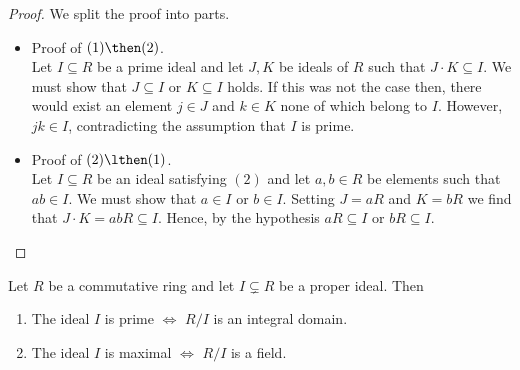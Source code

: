 \documentclass[12pt, a4paper]{article}
\begin{document}
\begin{proof}
    We split the proof into parts.
    \begin{itemize}
        \item Proof of \((1) \then (2)\). \\
        Let \(I \subseteq R\) be a prime ideal and let \(J,K\) be ideals of \(R\) such that \(J \cdot K \subseteq I\). We must show that \(J \subseteq I\) or \(K\subseteq I\) holds. If this was not the case then, there would exist an element \(j \in J\) and \(k \in K\) none of which belong to \(I\). However, \(jk \in I\), contradicting the assumption that \(I\) is prime.
        \item Proof of \((2) \lthen (1)\). \\
        Let \(I \subseteq R\) be an ideal satisfying \((2)\) and let \(a,b \in R\) be elements such that \(ab \in I\). We must show that \(a \in I\) or \(b \in I\). Setting \(J=aR\) and \(K=bR\) we find that \(J \cdot K = abR \subseteq I\). Hence, by the hypothesis \(aR \subseteq I\) or \(bR \subseteq I\).
    \end{itemize}
\end{proof}

\begin{mdprop}
    Let \(R\) be a commutative ring and let \(I \subsetneq R\) be a proper ideal. Then 
    \begin{enumerate}
        \item The ideal \(I\) is prime \(\iff\) \(R/I\) is an integral domain.
        \item The ideal \(I\) is maximal \(\iff\) \(R/I\) is a field.
    \end{enumerate}
\end{mdprop}
\end{document}
